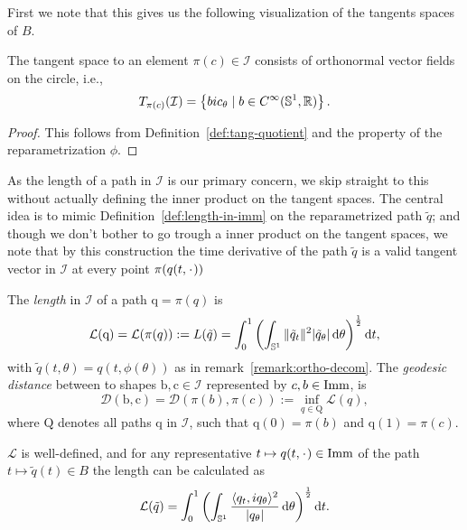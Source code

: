 First we note that this gives us the following visualization of the tangents spaces of $B$.

\begin{proposition}
  \label{prop:tangent-space-orthogonal}
The tangent space to an element $\pi(c) \in \mathcal{I}$ consists of orthonormal vector fields on the circle, i.e.,
  \begin{equation*}
    T_{\pi(c)}(\mathcal{I}) =
    \left\{
      b i c_{\theta} \mid b \in C^{\infty}(\mathbb{S}^1,\mathbb{R})
    \right\}.
  \end{equation*}
\end{proposition}

\begin{proof}
  This follows from Definition~\ref{def:tang-quotient} and the property of the reparametrization $\phi$.
\end{proof}

As the length of a path in $\mathcal{I}$ is our primary concern, we skip straight to this without actually defining the inner product on the tangent spaces. The central idea is to mimic Definition~\ref{def:length-in-imm} on the reparametrized path $\tilde{q}$; and though we don't bother to go trough a inner product on the tangent spaces, we note that by this construction the time derivative of the path $\tilde{q}$ is a valid tangent vector in $\mathcal{I}$ at every point $\pi(q(t,\blank))$

\begin{definition}
  The \textit{length} in $\mathcal{I}$ of a path $\mathrm{q}=\pi(q)$ is
  \begin{equation*}
    \mathcal{L}(\mathrm{q})= \mathcal{L}(\pi(q)) := L(\tilde{q}) =
    \int_{0}^{1}
    \left(
      \int_{\mathbb{S}^{1}} \|\tilde{q}_t\|^2 |\tilde{q}_{\theta}| \mathop{}\!\mathrm{d} \theta
    \right)^{\frac{1}{2}}
    \mathop{}\!\mathrm{d} t,
  \end{equation*}
  with $\tilde{q}(t,\theta)=q(t,\phi(\theta))$ as in remark~\ref{remark:ortho-decom}.
  The \textit{geodesic distance} between to shapes $\mathrm{b}, \mathrm{c} \in \mathcal{I}$ represented by $c,b \in \mathop{}\!\mathrm{Imm}$, is
  \begin{equation*}
    \mathcal{D}(\mathrm{b},\mathrm{c}) = \mathcal{D}(\pi(b),\pi(c)) := \inf_{q \in \mathrm{Q}} \mathcal{L}(q),
  \end{equation*}
  where $\mathrm{Q}$ denotes all paths $\mathrm{q}$ in $\mathcal{I}$, such that $\mathrm{q}(0)=\pi(b)$ and $\mathrm{q}(1)=\pi(c)$.
\end{definition}

\begin{proposition}
  \label{prop:length-quotient}
    $\mathcal{L}$ is well-defined, and for any representative $t \mapsto q(t, \blank) \in \I $ of the path $t \mapsto \tilde{q}(t) \in B$ the length can be calculated as
    \begin{equation}
      \label{eq:length-quotient}
    \mathcal{L}(\tilde{q}) = \int_{0}^{1}
    \left(
      \int_{\mathbb{S}^1}  \frac{\langle q_t, i q_{\theta}\rangle^2}{|q_{\theta}|} \mathop{}\!\mathrm{d} \theta
    \right)^{\frac{1}{2}} \mathop{}\!\mathrm{d} t.
  \end{equation}
\end{proposition}

